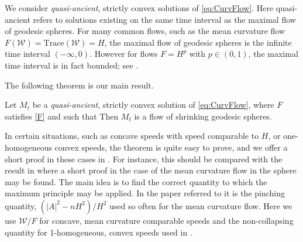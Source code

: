 \documentclass{amsart}
\begin{document}
We consider \emph{quasi-ancient}, strictly convex solutions of \eqref{eq:CurvFlow}. Here quasi-ancient refers to solutions existing on the same time interval as the maximal flow of geodesic spheres. For many common flows, such as the mean curvature flow \(F(\mathcal{W}) = \text{Trace}(\mathcal{W}) = H\), the maximal flow of geodesic spheres is the infinite time interval \((-\infty, 0)\). However for flows \(F = H^p\) with \(p \in (0,1)\), the maximal time interval is in fact bounded; see .

The following theorem is our main result.
\begin{thm}
Let \(M_t\) be a \emph{quasi-ancient}, strictly convex solution of \eqref{eq:CurvFlow}, where $F$ satisfies \cref{F} and such that
 Then \(M_t\) is a flow of shrinking geodesic spheres.
\end{thm}
In certain situations, such as concave speeds with speed comparable to \(H\), or one-homogeneous convex speeds, the theorem is quite easy to prove, and we offer a short proof in these cases in . For instance, this should be compared with the result in \cite[Theorem]{HuiskenSinestrari:05/2014} where a short proof in the case of the mean curvature flow in the sphere may be found. The main idea is to find the correct quantity to which the maximum principle may be applied. In the paper referred to it is the pinching quantity, \((|A|^2 - n H^2)/H^2\) used so often for the mean curvature flow. Here we use \(\mathcal{W}/F\) for concave, mean curvature comparable speeds and the non-collapsing quantity for 1-homogeneous, convex speeds used in \cite{andrews2015Non-collapsing}.
\end{document}
